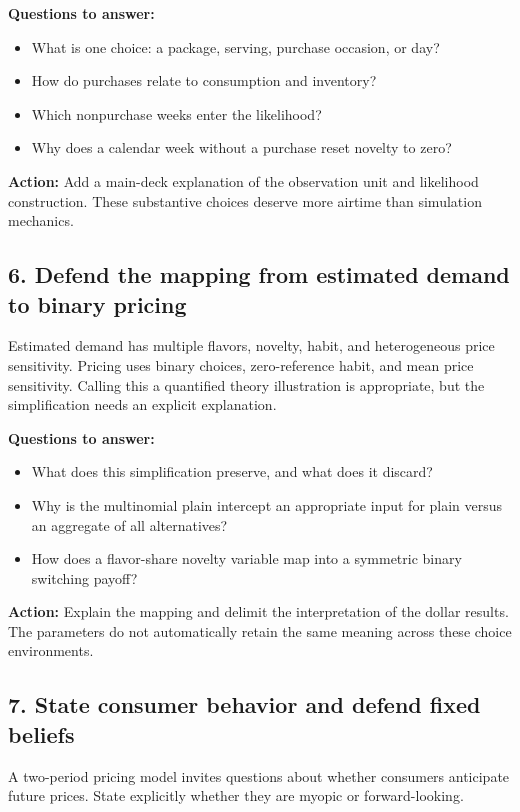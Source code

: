 \documentclass[11pt]{article}
\begin{document}
\textbf{Questions to answer:}
\begin{itemize}
\item What is one choice: a package, serving, purchase occasion, or day?
\item How do purchases relate to consumption and inventory?
\item Which nonpurchase weeks enter the likelihood?
\item Why does a calendar week without a purchase reset novelty to zero?
\end{itemize}

\textbf{Action:} Add a main-deck explanation of the observation unit and likelihood construction. These substantive choices deserve more airtime than simulation mechanics.

\subsection{6. Defend the mapping from estimated demand to binary pricing}
Estimated demand has multiple flavors, novelty, habit, and heterogeneous price sensitivity. Pricing uses binary choices, zero-reference habit, and mean price sensitivity. Calling this a quantified theory illustration is appropriate, but the simplification needs an explicit explanation.

\textbf{Questions to answer:}
\begin{itemize}
\item What does this simplification preserve, and what does it discard?
\item Why is the multinomial plain intercept an appropriate input for plain versus an aggregate of all alternatives?
\item How does a flavor-share novelty variable map into a symmetric binary switching payoff?
\end{itemize}

\textbf{Action:} Explain the mapping and delimit the interpretation of the dollar results. The parameters do not automatically retain the same meaning across these choice environments.

\subsection{7. State consumer behavior and defend fixed beliefs}
A two-period pricing model invites questions about whether consumers anticipate future prices. State explicitly whether they are myopic or forward-looking.
\end{document}
